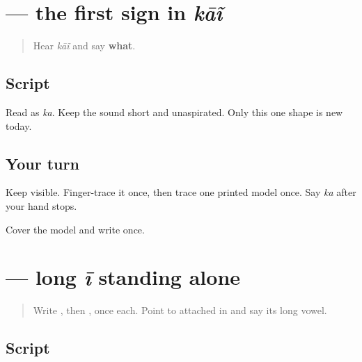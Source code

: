 \section[\texorpdfstring{\mw{क} (ka)}{क (ka)}]{ — the first sign in \emph{kāĩ}}

\label{lesson:MW-W05-ka}



\begin{quote}
Hear \emph{kāĩ} and say \textbf{what}.
\end{quote}

\subsection*{Script}

\begin{quote}
\end{quote}

Read \textbf{} as \emph{ka}. Keep the sound short and unaspirated. Only this one shape is new today.

\subsection*{Your turn}
Keep \textbf{} visible. Finger-trace it once, then trace one printed model once. Say \emph{ka} after your hand stops.

\begin{tcolorbox}[breakable,colback=teal!4,colframe=teal!35!black,title={Before you move on}]
Cover the model and write \textbf{} once.
\end{tcolorbox}
\section[\texorpdfstring{\mw{ई} (ī)}{ई (ī)}]{ — long \emph{ī} standing alone}

\label{lesson:MW-W05-ii-independent}



\begin{quote}
Write \textbf{}, then \textbf{}, once each. Point to attached \textbf{} in \textbf{} and say its long vowel.
\end{quote}

\subsection*{Script}

